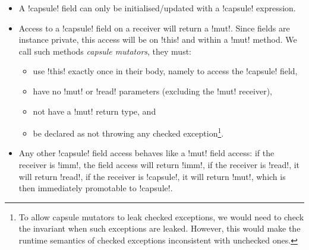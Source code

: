 \SSI\begin{itemize}
	\item A \Q!capsule! field can only be initialised/updated with a \Q!capsule! expression.
	\item Access to a \Q!capsule! field on a \Q@mut@ receiver will return a \Q!mut!. Since fields are instance private, this access will be on \Q!this! and within a \Q!mut! method. We call such methods \emph{capsule mutators}, they must:
	\begin{itemize}
		\item use \Q!this! exactly once in their body, namely to access the \Q!capsule! field,
		\item have no \Q!mut! or \Q!read! parameters (excluding the \Q!mut! receiver),
		\item not have a \Q!mut! return type, and
		\item be declared as not throwing any checked exception\footnote{To allow capsule mutators to leak checked exceptions, we would need to check the invariant when such exceptions are leaked. However, this would make the runtime semantics of checked exceptions inconsistent with unchecked ones.}.
	\end{itemize}	
	\item Any other \Q!capsule! field access behaves like a \Q!mut! field access: if the receiver is \Q!imm!, the field access will return \Q!imm!, if the receiver is \Q!read!, it will return \Q!read!, if the receiver is \Q!capsule!, it will return \Q!mut!, which is then immediately promotable to \Q!capsule!. %
	
\end{itemize}

